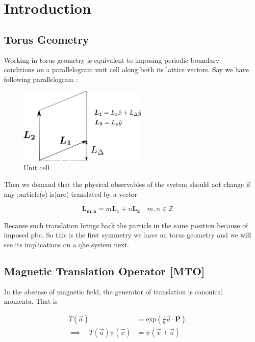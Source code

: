 \documentclass[11pt,a4paper,notitlepage]{article}
\newcommand{\bsym}{\boldsymbol}
\newcommand{\non}{\nonumber}
\begin{document}
	\section{Introduction}
	\hrulefill
	\subsection{Torus Geometry}
	Working in torus geometry is equivalent to imposing periodic boundary conditions on a parallelogram unit cell along both its lattice vectors. Say we have following parallelogram :

 		\begin{figure}[h]
    			\centering
    			\includegraphics[width=2.5in]{figures/pngs/unit_cell_torus.png}
   			\caption{Unit cell}
    			\label{fig1}
  		\end{figure}

  		Then we demand that the physical observables of the system should not change if any particle(s) is(are) 
  		translated by a vector
  
  		\begin{equation*}
    			\bsym{L_{m,n}} = m\bsym{L_1} + n\bsym{L_2}\quad m,n \in  \mathbb{Z}
  		\end{equation*}
  
  			Because such translation brings back the particle in the same position because of imposed pbc. So this 
  			is the first symmetry we have on torus geometry and we will see its implications on a qhe system next.

	\subsection{Magnetic Translation Operator [MTO]}
  		In the absense of magnetic field, the generator of translation is canonical momenta. That is

  		\begin{align}
    			T(\vec{a}) &= \text{exp}\left( \frac{\iota}{\hbar}{\vec{a}\cdot\bsym{P}}\right) \\
    			\implies \quad T(\vec{a})\psi(\vec{x}) &= \psi(\vec{x}+\vec{a}) \non
  		\end{align}
  			  
\end{document}
